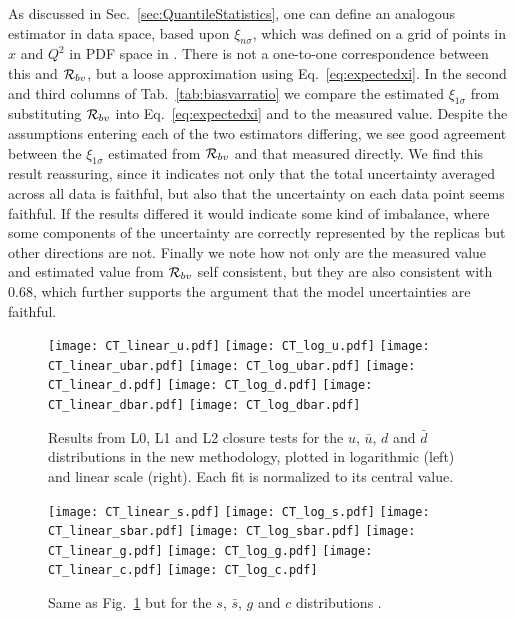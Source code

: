 As discussed in Sec.~\ref{sec:QuantileStatistics}, one can define an analogous
estimator in data space, based upon $\xi_{n\sigma}$, which was defined on a grid
of points in $x$ and $Q^2$ in PDF space in \cite{nnpdf30}. There is not a
one-to-one correspondence between this and $\mathcal{R}_{bv}$, but a loose
approximation using Eq.~\ref{eq:expectedxi}. In the second and third columns of
Tab.~\ref{tab:biasvarratio} we compare the estimated $\xi_{1\sigma}$ from
substituting $\mathcal{R}_{bv}$ into Eq.~\ref{eq:expectedxi} and to the measured
value. Despite the assumptions entering each of the two estimators differing, we
see good agreement between the $\xi_{1\sigma}$ estimated from $\mathcal{R}_{bv}$
and that measured directly. We find this result reassuring, since it indicates
not only that the total uncertainty averaged across all data is faithful, but
also that the uncertainty on each data point seems faithful. If the results
differed it would indicate some kind of imbalance, where some components of the
uncertainty are correctly represented by the replicas but other directions are
not. Finally we note how not only are the measured value and estimated value
from $\mathcal{R}_{bv}$ self consistent, but they are also consistent with $0.68$,
which further supports the argument that the model uncertainties are faithful.

\iffalse
\begin{figure}[ht]
    \centering
    \texttt{[image: CT\_linear\_u.pdf]}
    \texttt{[image: CT\_log\_u.pdf]}
    \texttt{[image: CT\_linear\_ubar.pdf]}
    \texttt{[image: CT\_log\_ubar.pdf]}
    \texttt{[image: CT\_linear\_d.pdf]}
    \texttt{[image: CT\_log\_d.pdf]}
    \texttt{[image: CT\_linear\_dbar.pdf]}
    \texttt{[image: CT\_log\_dbar.pdf]}
    \caption{Results from L0, L1 and L2 closure tests for the $u$, $\bar{u}$,
    $d$ and $\bar{d}$ distributions in the new methodology, plotted in
    logarithmic (left) and linear scale (right). Each fit is normalized to its
    central value.}
    \label{fig:nnpdf40_ct_errors1}    
\end{figure}


\begin{figure}[ht]
    \centering
    \texttt{[image: CT\_linear\_s.pdf]}
    \texttt{[image: CT\_log\_s.pdf]}
    \texttt{[image: CT\_linear\_sbar.pdf]}
    \texttt{[image: CT\_log\_sbar.pdf]}
    \texttt{[image: CT\_linear\_g.pdf]}
    \texttt{[image: CT\_log\_g.pdf]}
    \texttt{[image: CT\_linear\_c.pdf]}
    \texttt{[image: CT\_log\_c.pdf]}
    \caption{Same as Fig.~\ref{fig:nnpdf40_ct_errors1} but for the $s$,
    $\bar{s}$, $g$ and $c$ distributions .}
    \label{fig:nnpdf40_ct_errors2}    
\end{figure}

